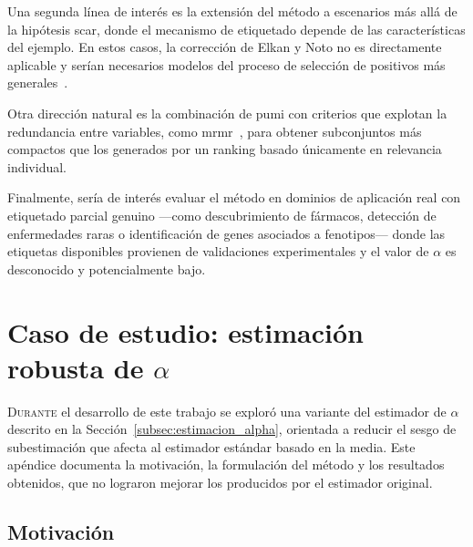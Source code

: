 Una segunda línea de interés es la extensión del método a escenarios más allá de la hipótesis \acrshort{scar}, donde el mecanismo de etiquetado depende de las características del ejemplo. En estos casos, la corrección de Elkan y Noto no es directamente aplicable y serían necesarios modelos del proceso de selección de positivos más generales~\cite{bekker2020learning}.

Otra dirección natural es la combinación de \acrshort{pumi} con criterios que explotan la redundancia entre variables, como \acrshort{mrmr}~\cite{peng2005feature}, para obtener subconjuntos más compactos que los generados por un ranking basado únicamente en relevancia individual.

Finalmente, sería de interés evaluar el método en dominios de aplicación real con etiquetado parcial genuino ---como descubrimiento de fármacos, detección de enfermedades raras o identificación de genes asociados a fenotipos--- donde las etiquetas disponibles provienen de validaciones experimentales y el valor de $\alpha$ es desconocido y potencialmente bajo.

\appendix
\chapter[Estimación robusta de \texorpdfstring{$\alpha$}{alpha}]{Caso de estudio: estimación robusta de \texorpdfstring{$\alpha$}{alpha}}
\label{chap:apendice_alpha_robusto}

\lettrine{D}{urante} el desarrollo de este trabajo se exploró una variante del estimador de $\alpha$ descrito en la Sección~\ref{subsec:estimacion_alpha}, orientada a reducir el sesgo de subestimación que afecta al estimador estándar basado en la media. Este apéndice documenta la motivación, la formulación del método y los resultados obtenidos, que no lograron mejorar los producidos por el estimador original.

\section{Motivación}
\label{sec:apendice_motivacion}

